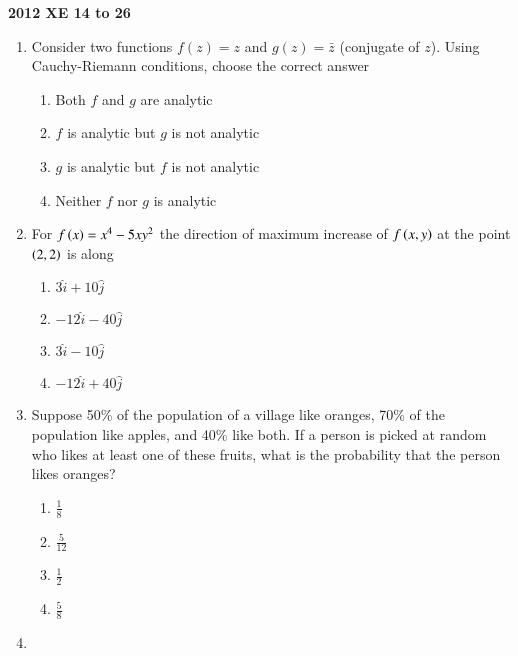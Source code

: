 \documentclass[journal]{IEEEtran}
\begin{document}
    
        \textbf{2012 XE 14 to 26}\\
\begin{enumerate}
	\item{
		Consider two functions
		\( f(z) = z \)
		and
		\( g(z) = \bar{z} \)
		(conjugate of \( z \)). Using Cauchy-Riemann conditions, choose the correct answer
		
		\begin{multicols}{2}
			\begin{enumerate}
				\item Both \(f\) and \(g\) are analytic
				\item \(f\) is analytic but \(g\) is not analytic
				\item \(g\) is analytic but \(f\) is not analytic
				\item Neither \(f\) nor \(g\) is analytic 
			\end{enumerate}
		\end{multicols}
	}
   	\item{
    	For $f\left(x\right) = x^4 - 5xy^2 $ the direction of maximum increase of \( f\left(x,y\right) \) at the point \( \left(2,2\right) \) is along \text{  }\hfill
    	
    	\begin{multicols}{4}
    		\begin{enumerate}
    			\item \(3\hat{i} + 10\hat{j}\)
    			
    			\item \(-12\hat{i} - 40\hat{j}\)
    			
    			\item \(3\hat{i} - 10\hat{j}\)
    			
    			\item \(-12\hat{i} + 40\hat{j}\)
    		\end{enumerate}
    	\end{multicols}
    }
    \item{
            Suppose 50\% of the population of a village like oranges, 70\% of the population like apples, and 40\% like both. If a person is picked at random who likes at least one of these fruits, what is the probability that the person likes oranges?
                
            \begin{multicols}{4}
                \begin{enumerate}
                	\item \( \frac{1}{8} \)
                	\item \( \frac{5}{12} \)
                	\item \( \frac{1}{2} \)
                	\item \( \frac{5}{8} \)
                \end{enumerate}
            \end{multicols}
        }
	\item{
        	
}
\end{enumerate}
\end{document}
